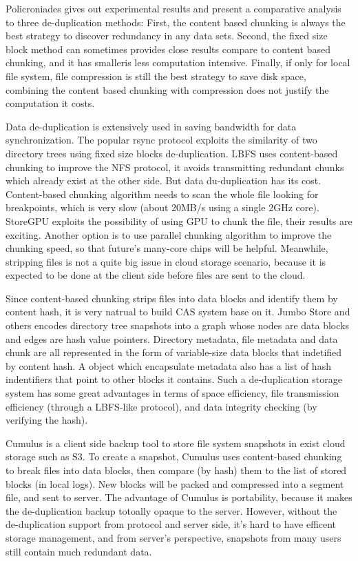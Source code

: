 Policroniades\cite{poli04} gives out
experimental results and present a comparative analysis
to three de-duplication methods: First, the content based chunking
is always the best strategy to discover redundancy in any data sets.
Second, the fixed size block method can sometimes provides
close results compare to content based chunking, and it has smalleris less
computation intensive. Finally, if only for local file system,
file compression is still the
best strategy to save disk space, combining the content based chunking
with compression does not justify the computation it costs.

Data de-duplication is extensively used in saving bandwidth for data synchronization.
The popular rsync\cite{rsync} protocol exploits the similarity of two directory trees
using fixed size blocks de-duplication. 
LBFS uses content-based chunking to improve the NFS protocol, 
it avoids transmitting redundant chunks which already exist at the other side.
But data du-duplication has its cost. Content-based chunking algorithm needs to
scan the whole file looking for breakpoints, which is very slow (about 20MB/s using a single 2GHz core). 
StoreGPU\cite{storegpu08}
exploits the possibility of using GPU to chunk the file,
their results are exciting. Another option is to use parallel
chunking algorithm to improve the chunking speed,
so that future's many-core chips will be helpful. 
Meanwhile, stripping files is not a quite big issue in cloud storage scenario,
because it is expected to be done at the client side before files are
sent to the cloud.

Since content-based chunking strips files into data blocks 
and identify them by content hash,
it is very natrual to build CAS system base on it.
Jumbo Store and others\cite{jumbo07,efficient_dedup05,you06} encodes directory tree snapshots
into a graph whose nodes are data blocks and edges
are hash value pointers.
Directory metadata, file metadata and data chunk are all
represented in the form of variable-size data blocks that indetified by content hash.
A object which encapsulate metadata also has a list of hash indentifiers 
that point to other blocks it contains.
Such a de-duplication storage system has some great advantages 
in terms of space efficiency, file transmission efficiency (through a LBFS-like protocol), 
and data integrity checking (by verifying the hash).

Cumulus\cite{cumulus09} is a client side backup tool to store 
file system snapshots in exist cloud storage such as S3.
To create a snapshot, Cumulus uses content-based chunking to break files into data blocks,
then compare (by hash) them to the list of stored blocks (in local logs).
New blocks will be packed and compressed into a segment file, and sent to server.
The advantage of Cumulus is portability, because it makes 
the de-duplication backup totoally opaque to the server.
However, without the de-duplication support from protocol and server side, 
it's hard to have efficent storage management, and from server's perspective,
snapshots from many users still contain much redundant data.


